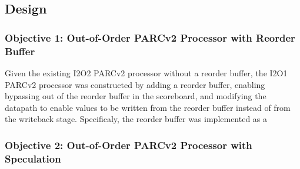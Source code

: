 \documentclass[11pt]{article}
\begin{document}
\subsection*{Design}

\subsubsection*{Objective 1: Out-of-Order PARCv2 Processor with Reorder Buffer}

Given the existing I2O2 PARCv2 processor without a reorder buffer, 
the I2O1 PARCv2 processor was constructed by adding a reorder buffer, 
enabling bypassing out of the reorder buffer in the scoreboard, and
modifying the datapath to enable values to be written from the reorder buffer instead
of from the writeback stage. Specificaly, the reorder buffer was implemented as
a 

%
\subsubsection*{Objective 2: Out-of-Order PARCv2 Processor with Speculation}
\end{document}

